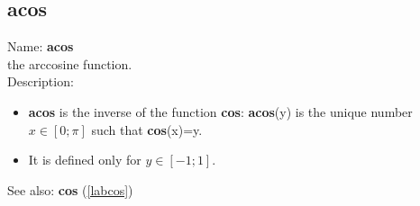 \subsection{acos}
\label{labacos}
\noindent Name: \textbf{acos}\\
the arccosine function.\\
\noindent Description: \begin{itemize}

\item \textbf{acos} is the inverse of the function \textbf{cos}: \textbf{acos}(y) is the unique number 
   $x \in [0; \pi]$ such that \textbf{cos}(x)=y.

\item It is defined only for $y \in [-1;1]$.
\end{itemize}
See also: \textbf{cos} (\ref{labcos})

